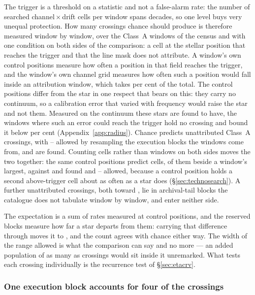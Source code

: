 The trigger is a threshold on a statistic and not a false-alarm rate: the
number of searched channel\,$\times$\,drift cells per window spans
\TuCellsDecades{} decades, so one level buys very unequal protection. How
many crossings chance should produce is therefore measured window by window,
over the \CeNWin{} Class~A windows of the census and with one condition on
both sides of the comparison: a cell at the stellar position that reaches the
trigger and that the line mask does not attribute. A window's own \NCtrl{}
control positions measure how often a position in that field reaches the
trigger, and the window's own channel grid measures how often such a position
would fall inside an attribution window, which takes \CeMaskPct{} per cent of
the total. The control positions differ from the star in one respect that
bears on this: they carry no continuum, so a calibration error that varied
with frequency would raise the star and not them. Measured on the continuum
these stars are found to have, the windows where such an error could reach
the trigger hold no crossing and bound it below \CxResidHiPct{} per cent
(Appendix~\ref{app:radius}). Chance predicts \CeExp{} unattributed Class~A
crossings, with \CeLo--\CeHi{} allowed by resampling the execution blocks the
windows come from, and \CeObs{} are found. Counting cells rather than windows
on both sides moves the two together: the same \CkNCtrlPos{} control positions
predict \CkExp{} cells, \CkExpSec{} of them beside a window's largest, against
\CkNObs{} and \CkNSecUnattr{} found and \CkLo--\CkHi{} allowed, because a
control position holds a second above-trigger cell about as often as a star
does (\S\ref{sec:technosearch}). A further \CeNTailCrossWord{} unattributed
crossings, both toward \CeTailStar, lie in archival-tail blocks the catalogue
does not tabulate window by window, and enter neither side.

The expectation is a sum of rates measured at control positions, and the
reserved blocks measure how far a star departs from them: carrying that
difference through moves it to \CeExpX, and the count agrees with chance
either way. The width of the range allowed is what the comparison can say and
no more --- an added population of as many as \CeAddBlind{} crossings would
sit inside it unremarked. What tests each crossing individually is the
recurrence test of \S\ref{sec:etacrv}.

\subsubsection{One execution block accounts for four of the crossings}
\label{sec:bdblock}

